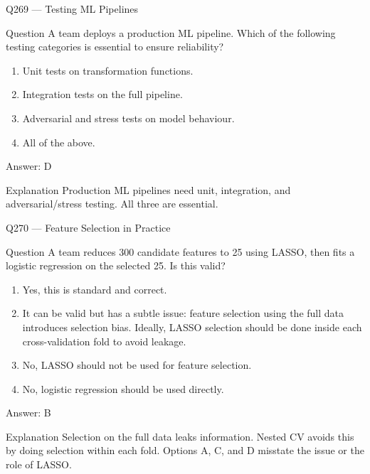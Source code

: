 \documentclass[aspectratio=169,8pt]{beamer}
\begin{document}
\begin{frame}{Q269 --- Testing ML Pipelines}
\begin{block}{Question}
A team deploys a production ML pipeline. Which of the following testing categories is essential to ensure reliability?
\begin{enumerate}
\item Unit tests on transformation functions.
\item Integration tests on the full pipeline.
\item Adversarial and stress tests on model behaviour.
\item All of the above.
\end{enumerate} \end{block}
\begin{exampleblock}{Answer: D}\end{exampleblock}
\begin{block}{Explanation}
Production ML pipelines need unit, integration, and adversarial/stress testing. All three are essential.
\end{block}
\end{frame}

\begin{frame}{Q270 --- Feature Selection in Practice}
\begin{block}{Question}
A team reduces 300 candidate features to 25 using LASSO, then fits a logistic regression on the selected 25. Is this valid?
\begin{enumerate}
\item Yes, this is standard and correct.
\item It can be valid but has a subtle issue: feature selection using the full data introduces selection bias. Ideally, LASSO selection should be done inside each cross-validation fold to avoid leakage.
\item No, LASSO should not be used for feature selection.
\item No, logistic regression should be used directly.
\end{enumerate} \end{block}
\begin{exampleblock}{Answer: B}\end{exampleblock}
\begin{block}{Explanation}
Selection on the full data leaks information. Nested CV avoids this by doing selection within each fold. Options A, C, and D misstate the issue or the role of LASSO.
\end{block}
\end{frame}
\end{document}
